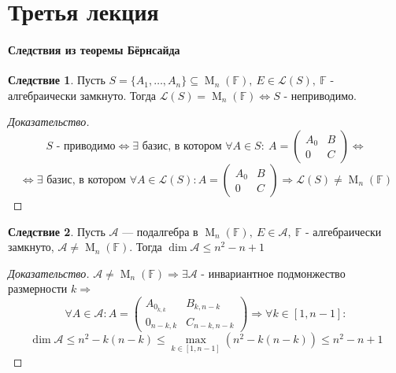 \documentclass[a4paper, 14pt]{extarticle}
\theoremstyle{definition}
\newtheorem{conseq}{Следствие}
\begin{document}
\newpage

\section{Третья лекция}
\paragraph{Следствия из теоремы Бёрнсайда}
\begin{conseq}
	Пусть \(S = \{A_1, \dots, A_n\} \subseteq \operatorname{M}_n(\mathbb{F}),\ E \in \mathcal{L}(S),\ \mathbb{F}\) - алгебраически замкнуто. Тогда \(\mathcal{L}(S) = \operatorname{M}_n(\mathbb{F}) \Leftrightarrow S\) - неприводимо.
\end{conseq}

\begin{proof}[Доказательство]
	~\newline
	\[S \text{ - приводимо} \Leftrightarrow \exists \text{ базис, в котором } \forall A \in S:\
	A = \left(
		\begin{array}{c|c}
			A_0&B\\
			\hline
			0&C
		\end{array}
	\right) \Leftrightarrow \] 
	\[\Leftrightarrow \exists \text{ базис, в котором } \forall A \in \mathcal{L}(S): A = \left(
		\begin{array}{c|c}
			A_0&B\\
			\hline
			0&C
		\end{array}
	\right) \Rightarrow \mathcal{L}(S) \neq \operatorname{M}_n(\mathbb{F})\]
\end{proof}

\begin{conseq}
	Пусть \(\mathcal{A}\) --- подалгебра в \(\operatorname{M}_n(\mathbb{F}),\ E \in \mathcal{A},\ \mathbb{F}\) - алгебраически замкнуто, \(\mathcal{A} \neq \operatorname{M}_n(\mathbb{F})\). Тогда \(\operatorname{dim} \mathcal{A} \leqslant n^2 - n + 1\)
\end{conseq}

\begin{proof}[Доказательство]
	\(\mathcal{A} \neq \operatorname{M}_n(\mathbb{F}) \Rightarrow \exists \mathcal{A}\) - инвариантное подмонжество размерности \(k \Rightarrow\)
	\[\forall A \in \mathcal{A} : A = \left(
		\begin{array}{c|c}
			A_{0_{k, k}}&B_{k, n - k}\\
			\hline
			0_{n - k, k}&C_{n - k, n - k}
		\end{array}
	\right) \Rightarrow \forall k \in [1, n - 1] :\]
	\[\operatorname{dim} \mathcal{A} \leqslant n^2 - k(n - k) \leqslant \max\limits_{k \in [1, n - 1]} \left(n^2 - k(n - k) \right) \leqslant n^2 - n + 1\]
\end{proof}
\end{document}
